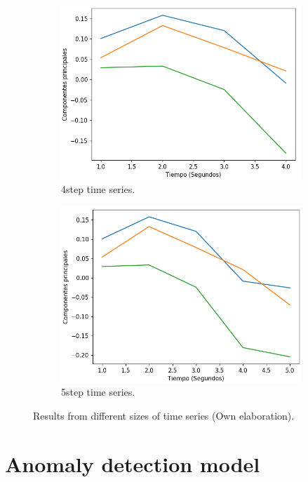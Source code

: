 \begin{figure}[H]
{\begin{varwidth}{\textwidth}
\begin{subfigure}[h]{0.45\textwidth}
            \includegraphics[width=\textwidth]{imagenes/Cap4/pca3-4}
            \caption{4\-step time series.}
            \label{fig:pasos4}
        \end{subfigure}       
        \begin{subfigure}[h]{0.45\textwidth} 
            \includegraphics[width=\textwidth]{imagenes/Cap4/pca3-5}
            \caption{5\-step time series.}
            \label{fig:pasos5}
        \end{subfigure}
        \end{varwidth}}
        \caption{Results from different sizes of time series (Own elaboration).}
		\label{fig:series-de-tiempo}
    \end{figure}
    
\section{Anomaly detection model}

